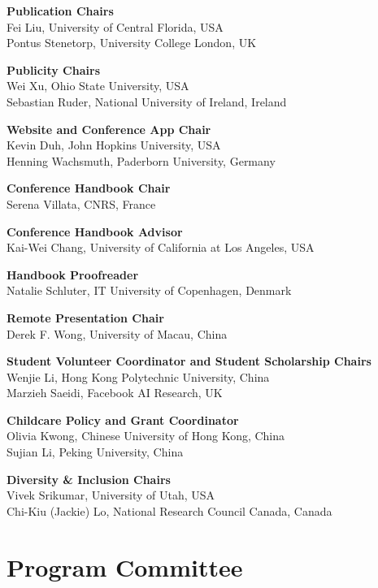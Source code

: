 {\bf Publication Chairs} \\
Fei Liu, University of Central Florida, USA \\
Pontus Stenetorp, University College London, UK


{\bf Publicity Chairs}\\
Wei Xu, Ohio State University, USA \\
Sebastian Ruder, National University of Ireland, Ireland


{\bf Website and Conference App Chair}\\
Kevin Duh, John Hopkins University, USA \\
Henning Wachsmuth, Paderborn University, Germany


{\bf Conference Handbook Chair}\\
Serena Villata, CNRS, France


{\bf Conference Handbook Advisor}\\
Kai-Wei Chang, University of California at Los Angeles, USA


{\bf Handbook Proofreader}\\
Natalie Schluter, IT University of Copenhagen, Denmark


{\bf Remote Presentation Chair}\\
Derek F. Wong, University of Macau, China


{\bf Student Volunteer Coordinator and Student Scholarship Chairs}\\
Wenjie Li, Hong Kong Polytechnic University, China \\
Marzieh Saeidi, Facebook AI Research, UK  


{\bf Childcare Policy and Grant Coordinator}\\
Olivia Kwong, Chinese University of Hong Kong, China \\
Sujian Li, Peking University, China


{\bf Diversity & Inclusion Chairs}\\
Vivek Srikumar, University of Utah, USA \\
Chi-Kiu (Jackie) Lo, National Research Council Canada, Canada


\clearpage
\section{Program Committee}
\setlength{\parindent}{0pt}

\vspace*{0.5cm}

